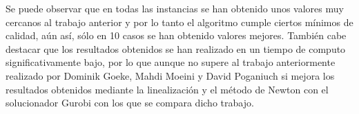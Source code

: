 \begin{footnotesize}
\end{footnotesize}

Se puede observar que en todas las instancias se han obtenido unos valores muy cercanos al trabajo anterior y por lo tanto el algoritmo cumple ciertos mínimos de calidad, aún así, sólo en 10 casos se han obtenido valores mejores.
También cabe destacar que los resultados obtenidos se han realizado en un tiempo de computo significativamente bajo, por lo que aunque no supere al trabajo anteriormente realizado por Dominik Goeke, Mahdi Moeini y David Poganiuch \cite{mrcp-GOEKE2017283} si mejora los resultados obtenidos mediante la linealización y el método de Newton con el solucionador Gurobi con los que se compara dicho trabajo.










